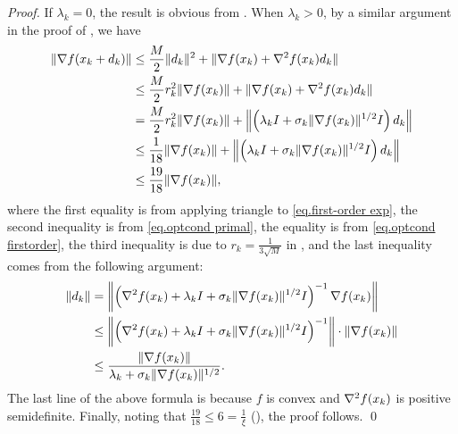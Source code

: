 \begin{proof}
    If $\lambda_k=0$, the result is obvious from . When $\lambda_k> 0$, by a similar argument in the proof of , we have
    \begin{align}
        \nonumber            \|\nabla f(x_k+d_k)\|&\leq \frac{M}{2}\|d_k\|^2+ \|\nabla f(x_k) + \nabla ^2 f(x_k) d_k\| \\
        & \leq \frac{M}{2}r_k^2\|\nabla f(x_k)\| + \|\nabla f(x_k) + \nabla ^2 f(x_k) d_k\|                                            \\
        \nonumber
                               & =\frac{M}{2}r_k^2\|\nabla f(x_k)\|+\left\|\left(\lambda_k I +\sigma_k\|\nabla f(x_k)\|^{1/2}I\right)d_k\right\| \\
        \nonumber                                  & \leq \frac{1}{18}\|\nabla f(x_k)\|+\left\|\left(\lambda_k I +\sigma_k\|\nabla f(x_k)\|^{1/2}I\right)d_k\right\| \\
        \label{eq.cond3.gen}                                  & \leq \frac{19}{18}\|\nabla f(x_k)\|,
    \end{align}
    where the first equality is from applying triangle to \eqref{eq.first-order exp}, the second inequality is from \eqref{eq.optcond primal}, the equality is from \eqref{eq.optcond firstorder}, the third inequality is due to $r_k=\frac{1}{3\sqrt{M}}$ in , and the last inequality comes from the following argument:
    \begin{equation*}
        \begin{aligned}
            \|d_k\| & =\left\|\left (\nabla ^2 f(x_k)+\lambda_k I +\sigma_k \|\nabla f(x_k)\|^{1/2} I \right )^{-1}\nabla f(x_k)\right\|                \\
                    & \leq \left\|\left (\nabla ^2 f(x_k)+\lambda_k I +\sigma_k \|\nabla f(x_k)\|^{1/2} I \right )^{-1}\right\| \cdot \|\nabla f(x_k)\| \\
                    & \leq \frac{\|\nabla f(x_k)\|}{\lambda_k+\sigma_k\|\nabla f(x_k)\|^{1/2}}.
        \end{aligned}
    \end{equation*}
    The last line of the above formula is because $f$ is convex and
    $\nabla ^2 f(x_k)$ is positive semidefinite. Finally, noting that $\frac{19}{18}\leq 6 = \frac{1}{\xi}$ (), the proof follows.
\smartqed \qed \end{proof}
